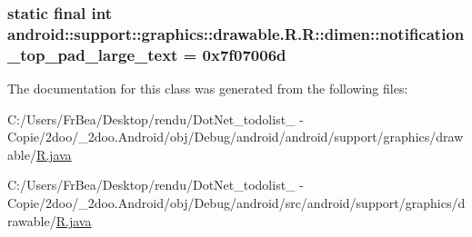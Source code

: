 \hypertarget{classandroid_1_1support_1_1graphics_1_1drawable_1_1_r_1_1dimen_4bb08cb1ea54f78d787366a5e635fb7a}{
\subsubsection[{notification\_\-top\_\-pad\_\-large\_\-text}]{\setlength{\rightskip}{0pt plus 5cm}static final int android::support::graphics::drawable.R.R::dimen::notification\_\-top\_\-pad\_\-large\_\-text = 0x7f07006d}}
\label{classandroid_1_1support_1_1graphics_1_1drawable_1_1_r_1_1dimen_4bb08cb1ea54f78d787366a5e635fb7a}




The documentation for this class was generated from the following files:\begin{CompactItemize}
\item 
C:/Users/FrBea/Desktop/rendu/DotNet\_\-todolist\_ - Copie/2doo/\_\-2doo.Android/obj/Debug/android/android/support/graphics/drawable/\hyperlink{android_2support_2graphics_2drawable_2_r_8java}{R.java}\item 
C:/Users/FrBea/Desktop/rendu/DotNet\_\-todolist\_ - Copie/2doo/\_\-2doo.Android/obj/Debug/android/src/android/support/graphics/drawable/\hyperlink{src_2android_2support_2graphics_2drawable_2_r_8java}{R.java}\end{CompactItemize}
